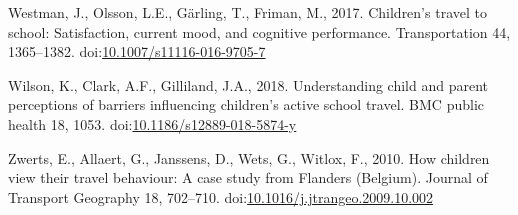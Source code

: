 \documentclass[]{elsarticle} %
\begin{document}
\leavevmode\hypertarget{ref-westmanChildrenTravelSchool2017}{}%
Westman, J., Olsson, L.E., Gärling, T., Friman, M., 2017. Children's
travel to school: Satisfaction, current mood, and cognitive performance.
Transportation 44, 1365--1382.
doi:\href{https://doi.org/10.1007/s11116-016-9705-7}{10.1007/s11116-016-9705-7}

\leavevmode\hypertarget{ref-wilsonUnderstandingChildParent2018}{}%
Wilson, K., Clark, A.F., Gilliland, J.A., 2018. Understanding child and
parent perceptions of barriers influencing children's active school
travel. BMC public health 18, 1053.
doi:\href{https://doi.org/10.1186/s12889-018-5874-y}{10.1186/s12889-018-5874-y}

\leavevmode\hypertarget{ref-zwertsHowChildrenView2010}{}%
Zwerts, E., Allaert, G., Janssens, D., Wets, G., Witlox, F., 2010. How
children view their travel behaviour: A case study from Flanders
(Belgium). Journal of Transport Geography 18, 702--710.
doi:\href{https://doi.org/10.1016/j.jtrangeo.2009.10.002}{10.1016/j.jtrangeo.2009.10.002}
\end{document}
